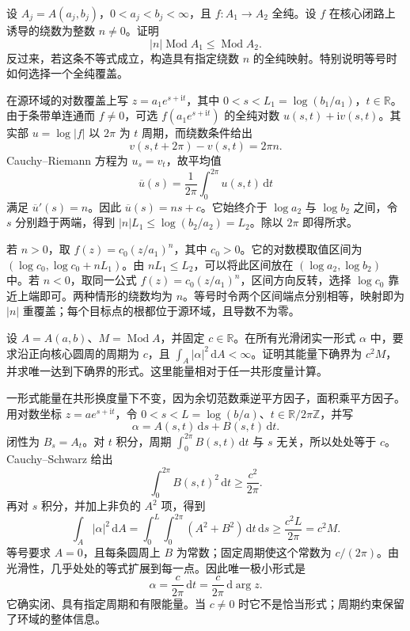 \begin{exercise}
	\label{g4:ex:0505:annulus-map-degree}
	设 \(A_j=A(a_j,b_j)\)，\(0<a_j<b_j<\infty\)，且 \(f:A_1\to A_2\) 全纯。设 \(f\) 在核心闭路上诱导的绕数为整数 \(n\ne0\)。证明
	\[
		|n|\operatorname{Mod}A_1\le\operatorname{Mod}A_2.
	\]
	反过来，若这条不等式成立，构造具有指定绕数 \(n\) 的全纯映射。特别说明等号时如何选择一个全纯覆盖。
\end{exercise}
\begin{solution}
	在源环域的对数覆盖上写 \(z=a_1e^{s+\mathrm{i}t}\)，其中 \(0<s<L_1=\log(b_1/a_1)\)，\(t\in\mathbb R\)。由于条带单连通而 \(f\ne0\)，可选 \(f(a_1e^{s+\mathrm{i}t})\) 的全纯对数 \(u(s,t)+\mathrm{i}v(s,t)\)。其实部 \(u=\log|f|\) 以 \(2\pi\) 为 \(t\) 周期，而绕数条件给出
	\[
		v(s,t+2\pi)-v(s,t)=2\pi n.
	\]
	Cauchy--Riemann 方程为 \(u_s=v_t\)，故平均值
	\[
		\overline u(s)=\frac1{2\pi}\int_0^{2\pi}u(s,t)\,\mathrm{d}t
	\]
	满足 \(\overline u'(s)=n\)。因此 \(\overline u(s)=ns+c\)。它始终介于 \(\log a_2\) 与 \(\log b_2\) 之间，令 \(s\) 分别趋于两端，得到 \(|n|L_1\le\log(b_2/a_2)=L_2\)。除以 \(2\pi\) 即得所求。

	若 \(n>0\)，取 \(f(z)=c_0(z/a_1)^n\)，其中 \(c_0>0\)。它的对数模取值区间为 \((\log c_0,\log c_0+nL_1)\)。由 \(nL_1\le L_2\)，可以将此区间放在 \((\log a_2,\log b_2)\) 中。若 \(n<0\)，取同一公式 \(f(z)=c_0(z/a_1)^n\)，区间方向反转，选择 \(\log c_0\) 靠近上端即可。两种情形的绕数均为 \(n\)。等号时令两个区间端点分别相等，映射即为 \(|n|\) 重覆盖；每个目标点的根都位于源环域，且导数不为零。
\end{solution}

\begin{exercise}
	\label{g4:ex:0501:period-energy}
	设 \(A=A(a,b)\)、\(M=\operatorname{Mod}A\)，并固定 \(c\in\mathbb R\)。在所有光滑闭实一形式 \(\alpha\) 中，要求沿正向核心圆周的周期为 \(c\)，且 \(\int_A|\alpha|^2\,\mathrm{d}A<\infty\)。证明其能量下确界为 \(c^2M\)，并求唯一达到下确界的形式。这里能量相对于任一共形度量计算。
\end{exercise}
\begin{solution}
	一形式能量在共形换度量下不变，因为余切范数乘逆平方因子，面积乘平方因子。用对数坐标 \(z=a e^{s+\mathrm{i}t}\)，令 \(0<s<L=\log(b/a)\)、\(t\in\mathbb R/2\pi\mathbb Z\)，并写
	\[
		\alpha=A(s,t)\,\mathrm{d}s+B(s,t)\,\mathrm{d}t.
	\]
	闭性为 \(B_s=A_t\)。对 \(t\) 积分，周期 \(\int_0^{2\pi}B(s,t)\,\mathrm{d}t\) 与 \(s\) 无关，所以处处等于 \(c\)。Cauchy--Schwarz 给出
	\[
		\int_0^{2\pi}B(s,t)^2\,\mathrm{d}t\ge\frac{c^2}{2\pi}.
	\]
	再对 \(s\) 积分，并加上非负的 \(A^2\) 项，得到
	\[
		\int_A|\alpha|^2\,\mathrm{d}A
		=\int_0^L\int_0^{2\pi}(A^2+B^2)\,\mathrm{d}t\,\mathrm{d}s
		\ge\frac{c^2L}{2\pi}=c^2M.
	\]
	等号要求 \(A=0\)，且每条圆周上 \(B\) 为常数；固定周期使这个常数为 \(c/(2\pi)\)。由光滑性，几乎处处的等式扩展到每一点。因此唯一极小形式是
	\[
		\alpha=\frac c{2\pi}\,\mathrm{d}t
		=\frac c{2\pi}\,\mathrm{d}\arg z.
	\]
	它确实闭、具有指定周期和有限能量。当 \(c\ne0\) 时它不是恰当形式；周期约束保留了环域的整体信息。
\end{solution}